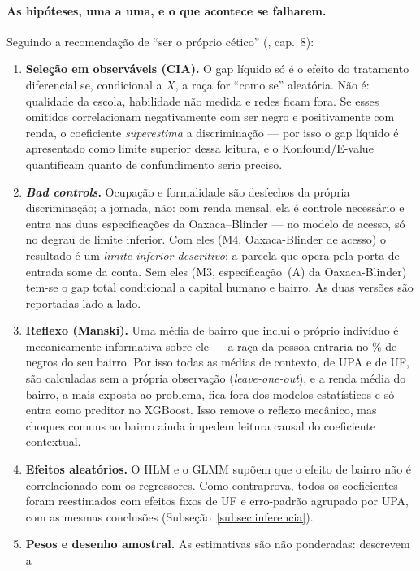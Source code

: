 \documentclass[12pt, a4paper, oneside]{article}
\begin{document}
\paragraph{As hipóteses, uma a uma, e o que acontece se falharem.}
Seguindo a recomendação de ``ser o próprio cético'' (, cap.~8):
\begin{enumerate}
  \item \textbf{Seleção em observáveis (CIA).} O gap líquido só é o efeito do tratamento
    diferencial se, condicional a $X$, a raça for ``como se'' aleatória. Não é: qualidade
    da escola, habilidade não medida e redes ficam fora. Se esses omitidos correlacionam
    negativamente com ser negro e positivamente com renda, o coeficiente \emph{superestima}
    a discriminação --- por isso o gap líquido é apresentado como limite superior dessa
    leitura, e o Konfound/E-value quantificam quanto de confundimento seria preciso.
  \item \textbf{\emph{Bad controls}.} Ocupação e formalidade são desfechos da
    própria discriminação; a jornada, não: com renda mensal, ela é controle necessário
    e entra nas duas especificações da Oaxaca--Blinder --- no modelo de acesso, só no
    degrau de limite inferior. Com eles (M4, Oaxaca-Blinder de acesso) o resultado é um
    \emph{limite inferior descritivo}: a parcela que opera pela porta de entrada some da
    conta. Sem eles (M3, especificação~(A) da Oaxaca-Blinder) tem-se o gap total
    condicional a capital humano e bairro. As duas versões são reportadas lado a lado.
  \item \textbf{Reflexo (Manski).} Uma média de bairro que inclui o próprio indivíduo é
    mecanicamente informativa sobre ele --- a raça da pessoa entraria no \% de negros do
    seu bairro. Por isso todas as médias de contexto, de UPA e de UF, são calculadas sem a
    própria observação (\emph{leave-one-out}), e a renda média do bairro, a mais exposta ao
    problema, fica fora dos modelos estatísticos e só entra como preditor no XGBoost. Isso remove o reflexo mecânico, mas choques
    comuns ao bairro ainda impedem leitura causal do coeficiente contextual.
  \item \textbf{Efeitos aleatórios.} O HLM e o GLMM supõem que o efeito de bairro não é
    correlacionado com os regressores. Como contraprova, todos os coeficientes foram
    reestimados com efeitos fixos de UF e erro-padrão agrupado por UPA, com as mesmas
    conclusões (Subseção~\ref{subsec:inferencia}).
  \item \textbf{Pesos e desenho amostral.} As estimativas são não ponderadas: descrevem a

\end{enumerate}
\end{document}

